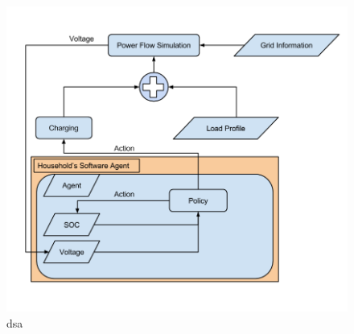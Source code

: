 \documentclass[a4paper]{article}
\begin{document}
\begin{figure}[!ht]
\includegraphics[width =\textwidth]{EV_smart_charging_model.png}
\caption{dsa}
\label{q1model}
\end{figure}
\end{document}
